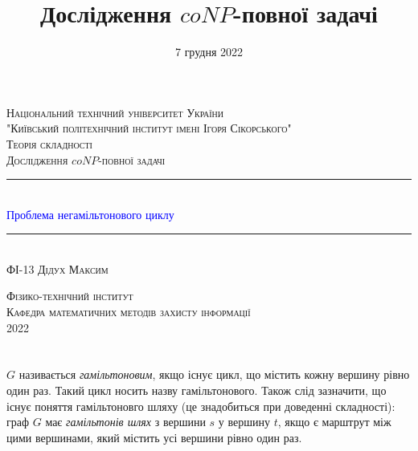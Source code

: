 \documentclass[14pt]{article}
\begin{document}
\begin{spacing}{1.175}	
	\begin{titlepage} 
		\newcommand{\HRule}{\rule{\linewidth}{0.3mm}}
		\center 
		
		\textsc{\large Національний технічний університет України
			\\"Київський політехнічний інститут імені Ігоря Сікорського"}\\[1.5cm]
		
		\vspace{5cm}
		\textsc{\large Теорія складності}\\[0.5cm]
		
		\textsc{\large Дослідження \(coNP\)-повної задачі}\\[0.5cm] 
		
		\HRule\\[0.4cm]
		
		{\huge \textcolor{blue}{Проблема негамільтонового циклу}}\\[0.4cm]
		
		\HRule\\[1.5cm]
		\textsc{\large ФІ-13 Дідух Максим}\\[0.5cm]
		
		\vspace{7.5cm}
		
		\textsc{\large Фізико-технічний інститут}\\[0.5cm]
		\textsc{\large Кафедра математичних методів захисту інформації}\\[0.5cm]
		{\large {2022}} 
	\end{titlepage}
    
    
    
    \newpage
    \title{\Large Дослідження \(coNP\)-повної задачі}
    \date{\large 7 грудня 2022}
    \maketitle
    \tableofcontents                                                                            %
    \newpage
    \section{}
         \(G\) називається \textit{гамільтоновим}, якщо існує цикл, що містить кожну вершину рівно один раз. Такий цикл носить назву гамільтонового. Також слід зазначити, що існує поняття гамільтоновго шляху (це знадобиться при доведенні складності): граф \(G\) має \textit{гамільтонів шлях} з вершини \(s\) у вершину \(t\), якщо є марштрут між цими вершинами, який містить усі вершини рівно один раз.
        

\end{spacing}
\end{document}
